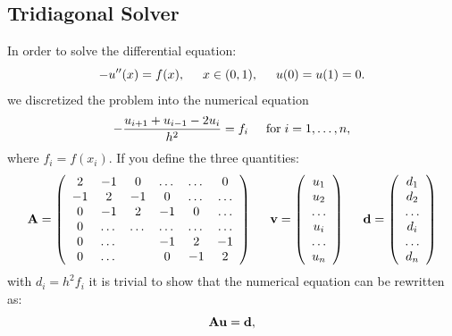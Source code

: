 \documentclass[10pt,a4paper,titlepage]{article}
\begin{document}
\subsection*{Tridiagonal Solver}
In order to solve the differential equation:
\[
-u''(x) = f(x), \hspace{0.5cm} x\in(0,1), \hspace{0.5cm} u(0) = u(1) = 0.
\]
we discretized the problem into the numerical equation
\[
   -\frac{u_{i+1}+u_{i-1}-2u_i}{h^2} = f_i  \hspace{0.5cm} \mathrm{for} \hspace{0.1cm} i=1,\dots, n,
\]
where $f_i=f(x_i)$.
If you define the three quantities:
\[
    {\bf A} = \left(\begin{array}{cccccc}
                           2& -1& 0 &\dots   & \dots &0 \\
                           -1 & 2 & -1 &0 &\dots &\dots \\
                           0&-1 &2 & -1 & 0 & \dots \\
                           0& \dots   & \dots &\dots   &\dots & \dots \\
                           0&\dots   &  &-1 &2& -1 \\
                           0&\dots    &  & 0  &-1 & 2 \\
                      \end{array} \right)
	\hspace{0.5cm}
    {\bf v} = \left(\begin{array}{c}
                           u_1\\
                           u_2\\
                           \dots\\
                           u_i\\
                           \dots\\
                           u_n\\
                      \end{array} \right)
                      \hspace{0.5cm}
	{\bf d} = \left(\begin{array}{c}
                           d_1\\
                           d_2\\
                           \dots\\
                           d_i\\
                           \dots\\
                           d_n\\
                      \end{array} \right)                  
\]
with $d_i=h^2 f_i$
it is trivial to show that the numerical equation can be rewritten as:
\[
   {\bf A}{\bf u} = {\bf d},
\]
\end{document}
